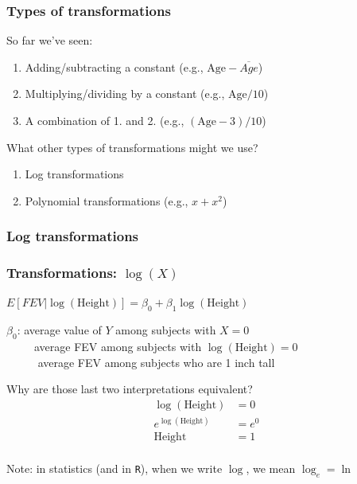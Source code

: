 \documentclass[12pt, 
hyperref={colorlinks=true, linkcolor=blue, urlcolor=cyan},dvipsnames]{beamer}
\begin{document}
\begin{frame}
\frametitle{Types of transformations}

So far we've seen:
\begin{enumerate}
\item Adding/subtracting a constant (e.g., $\text{Age} - \overline{Age}$)
\item Multiplying/dividing by a constant (e.g., $\text{Age}/10$)
\item A combination of 1. and 2. (e.g., $(\text{Age}-3)/10$)
\end{enumerate}

What other types of transformations might we use?
\begin{enumerate}
\item Log transformations
\item Polynomial transformations (e.g., $x + x^2$)
\end{enumerate}

\end{frame}

\subsubsection{Log transformations}
\begin{frame}
\frametitle{Transformations: $\log(X)$}
\begin{center} $E[FEV|\log(\text{Height})] = \beta_0 + \beta_1 \log(\text{Height})$ \end{center}

$\beta_0$: average value of $Y$ among subjects with $X = 0$\\ \pause 
\ \ \ \ \ average FEV among subjects with $\log(\text{Height}) = 0$\\ \pause 
\ \ \ \ \ \color{blue} average FEV among subjects who are 1 inch tall \color{black}  \pause

Why are those last two interpretations equivalent?
\begin{align*}
\log(\text{Height}) & = 0 \\
e^{\log(\text{Height})} & = e^0 \\
\text{Height} & = 1\\
\end{align*}
\begin{footnotesize} Note: in statistics (and in \texttt{R}), when we write $\log$, we mean $\log_e = \ln$ \end{footnotesize}
\end{frame}
\end{document}
